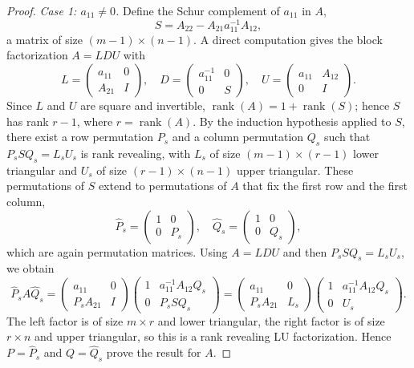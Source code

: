 \documentclass[final]{siamart1116}
\numberwithin{theorem}{section}
\DeclareMathOperator{\rk}{rank}
\newcommand{\by}{\times}
\begin{document}
\begin{proof}
  \emph{Case 1: $a_{11} \neq 0$.} Define the Schur complement of $a_{11}$ in $A$,
  \[
    S = A_{22} - A_{21} a_{11}^{-1} A_{12},
  \]
  a matrix of size $(m-1) \by (n-1)$. A direct computation gives the block factorization $A = LDU$ with
  \[
    L =
    \begin{pmatrix}
      a_{11} & 0 \\
      A_{21} & I
    \end{pmatrix}, \quad
    D =
    \begin{pmatrix}
      a_{11}^{-1} & 0 \\
      0           & S
    \end{pmatrix}, \quad
    U =
    \begin{pmatrix}
      a_{11} & A_{12} \\
      0      & I
    \end{pmatrix}.
  \]
  Since $L$ and $U$ are square and invertible, $\rk(A) = 1 + \rk(S)$; hence $S$ has rank $r-1$, where $r = \rk(A)$. By the induction hypothesis applied to $S$, there exist a row permutation $P_s$ and a column permutation $Q_s$ such that $P_s S Q_s = L_s U_s$ is rank revealing, with $L_s$ of size $(m-1) \by (r-1)$ lower triangular and $U_s$ of size $(r-1) \by (n-1)$ upper triangular. These permutations of $S$ extend to permutations of $A$ that fix the first row and the first column,
  \[
    \widehat{P}_s =
    \begin{pmatrix}
      1 & 0   \\
      0 & P_s
    \end{pmatrix}, \quad
    \widehat{Q}_s =
    \begin{pmatrix}
      1 & 0   \\
      0 & Q_s
    \end{pmatrix},
  \]
  which are again permutation matrices. Using $A = LDU$ and then $P_s S Q_s = L_s U_s$, we obtain
  \[
    \widehat{P}_s A \widehat{Q}_s
    =
    \begin{pmatrix}
      a_{11}     & 0 \\
      P_s A_{21} & I
    \end{pmatrix}
    \begin{pmatrix}
      1 & a_{11}^{-1} A_{12} Q_s \\
      0 & P_s S Q_s
    \end{pmatrix}
    =
    \begin{pmatrix}
      a_{11}     & 0   \\
      P_s A_{21} & L_s
    \end{pmatrix}
    \begin{pmatrix}
      1 & a_{11}^{-1} A_{12} Q_s \\
      0 & U_s
    \end{pmatrix}.
  \]
  The left factor is of size $m \by r$ and lower triangular, the right factor is of size $r \by n$ and upper triangular, so this is a rank revealing LU factorization. Hence $P = \widehat{P}_s$ and $Q = \widehat{Q}_s$ prove the result for $A$.


\end{proof}
\end{document}
